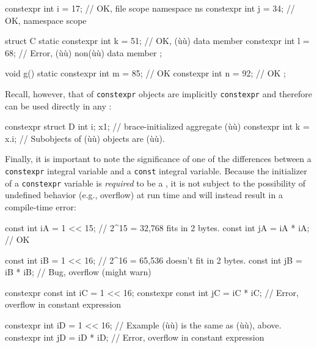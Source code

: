 \begin{enumerate}
{\begin{emcppslisting}
               constexpr int i = 17;    // OK, file scope
namespace ns { constexpr int j = 34; }  // OK, namespace scope

struct C
{
    static constexpr int k = 51;  // OK, (ù{}ù) data member
           constexpr int l = 68;  // Error, (ù{}ù) non(ù{}ù) data member
};

void g()
{
    static constexpr int m = 85;  // OK
           constexpr int n = 92;  // OK
};
\end{emcppslisting}
    
\noindent Recall, however, that  of
\lstinline!constexpr! objects are implicitly \lstinline!constexpr! and
therefore can be used directly in any :

\begin{emcppslisting}
constexpr struct D { int i; } x{1};  // brace-initialized aggregate (ù{}ù)
constexpr int k = x.i;  // Subobjects of (ù{}ù) objects are (ù{}ù).
\end{emcppslisting}
}
\end{enumerate}
    
\noindent Finally, it is important to note the significance of one of the
differences between a \lstinline!constexpr! integral variable and a
\lstinline!const! integral variable. Because the initializer of a
\lstinline!constexpr! variable is \emph{required} to be a , it is not subject to the possibility of undefined behavior
(e.g., overflow) at run time and will instead result in a compile-time
error:

\begin{emcppslisting}
          const int iA = 1 << 15;  // 2^15 = 32,768 fits in 2 bytes.
          const int jA = iA * iA;  // OK

          const int iB = 1 << 16;  // 2^16 = 65,536 doesn't fit in 2 bytes.
          const int jB = iB * iB;  // Bug, overflow (might warn)

constexpr const int iC = 1 << 16;
constexpr const int jC = iC * iC;  // Error, overflow in constant expression

constexpr       int iD = 1 << 16;  // Example (ù{}ù) is the same as (ù{}ù), above.
constexpr       int jD = iD * iD;  // Error, overflow in constant expression
\end{emcppslisting}
    
